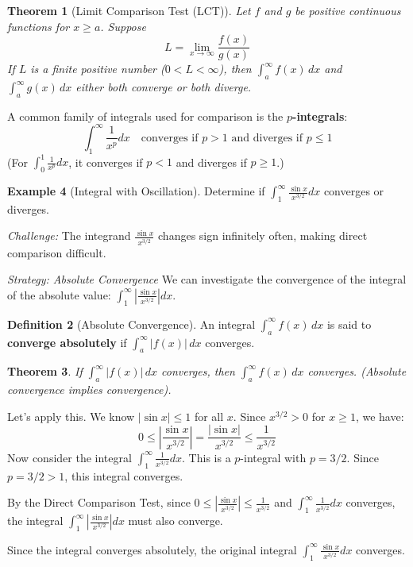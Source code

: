 \documentclass[11pt]{article}
\newtheorem{theorem}{Theorem}[section]
\theoremstyle{definition}
\newtheorem{definition}[theorem]{Definition}
\newtheorem{example}[theorem]{Example}
\theoremstyle{remark}
\begin{document}
\begin{theorem}[Limit Comparison Test (LCT)]
Let $f$ and $g$ be positive continuous functions for $x \ge a$. Suppose
\[ L = \lim_{x \to \infty} \frac{f(x)}{g(x)} \]
If $L$ is a finite positive number ($0 < L < \infty$), then $\int_a^\infty f(x)\,dx$ and $\int_a^\infty g(x)\,dx$ either both converge or both diverge.
\end{theorem}

A common family of integrals used for comparison is the \textbf{$p$-integrals}:
\[ \int_1^\infty \frac{1}{x^p} dx \quad \text{converges if } p > 1 \text{ and diverges if } p \le 1 \]
(For $\int_0^1 \frac{1}{x^p} dx$, it converges if $p < 1$ and diverges if $p \ge 1$.)

\begin{example}[Integral with Oscillation] \label{ex:sin_integral}
Determine if $\int_1^\infty \frac{\sin x}{x^{3/2}} dx$ converges or diverges.

\textit{Challenge:} The integrand $\frac{\sin x}{x^{3/2}}$ changes sign infinitely often, making direct comparison difficult.

\textit{Strategy: Absolute Convergence}
We can investigate the convergence of the integral of the absolute value: $\int_1^\infty \left| \frac{\sin x}{x^{3/2}} \right| dx$.

\begin{definition}[Absolute Convergence]
An integral $\int_a^\infty f(x)\,dx$ is said to \textbf{converge absolutely} if $\int_a^\infty |f(x)|\,dx$ converges.
\end{definition}

\begin{theorem}
If $\int_a^\infty |f(x)|\,dx$ converges, then $\int_a^\infty f(x)\,dx$ converges. (Absolute convergence implies convergence).
\end{theorem}

Let's apply this. We know $|\sin x| \le 1$ for all $x$. Since $x^{3/2} > 0$ for $x \ge 1$, we have:
\[ 0 \le \left| \frac{\sin x}{x^{3/2}} \right| = \frac{|\sin x|}{x^{3/2}} \le \frac{1}{x^{3/2}} \]
Now consider the integral $\int_1^\infty \frac{1}{x^{3/2}} dx$. This is a $p$-integral with $p = 3/2$. Since $p = 3/2 > 1$, this integral converges.

By the Direct Comparison Test, since $0 \le \left| \frac{\sin x}{x^{3/2}} \right| \le \frac{1}{x^{3/2}}$ and $\int_1^\infty \frac{1}{x^{3/2}} dx$ converges, the integral $\int_1^\infty \left| \frac{\sin x}{x^{3/2}} \right| dx$ must also converge.

Since the integral converges absolutely, the original integral $\int_1^\infty \frac{\sin x}{x^{3/2}} dx$ converges.
\end{example}
\end{document}
